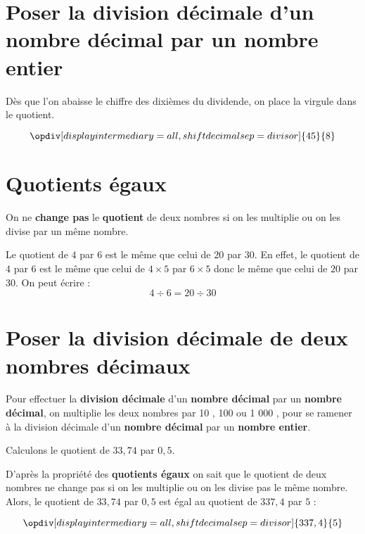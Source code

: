 \begin{pageCours}
\section{Poser la division décimale d'un nombre décimal par un nombre entier}

\begin{Mt}
Dès que l’on abaisse le chiffre des dixièmes du dividende, on place la virgule dans le quotient.

\[\opdiv[displayintermediary=all,shiftdecimalsep=divisor]{45}{8}\]
\end{Mt}

\section{Quotients égaux}

\begin{Pp}
On ne \textbf{change pas} le \textbf{quotient} de deux nombres si on les multiplie ou on les divise par un même nombre.
\end{Pp}

\begin{Ex}
Le quotient de $4$ par $6$ est le même que celui de $20$ par $30$.
En effet, le quotient de $4$ par $6$ est le même que celui de $4\times5$ par $6\times5$ donc le même que celui de $20$ par $30$. On peut écrire :
\[4\div6=20\div30\]
\end{Ex}

\section{Poser la division décimale de deux nombres décimaux}

\begin{Mt}
Pour effectuer la \textbf{division décimale} d'un \textbf{nombre décimal} par un \textbf{nombre décimal}, on multiplie les deux nombres par 10 , 100 ou 1 000 , pour se ramener à la division décimale d'un \textbf{nombre décimal} par un \textbf{nombre entier}.

\begin{Ex}
Calculons le quotient de $33,74$ par $0,5$.

D'après la propriété des \textbf{quotients égaux} on sait que le quotient de deux nombres ne change pas si on les multiplie ou on les divise pas le même nombre. Alors, le quotient de $33,74$ par $0,5$ est égal au quotient de $337,4$ par $5$ :

\[\opdiv[displayintermediary=all,shiftdecimalsep=divisor]{337,4}{5}\]
\end{Ex}
\end{Mt}


\end{pageCours}
